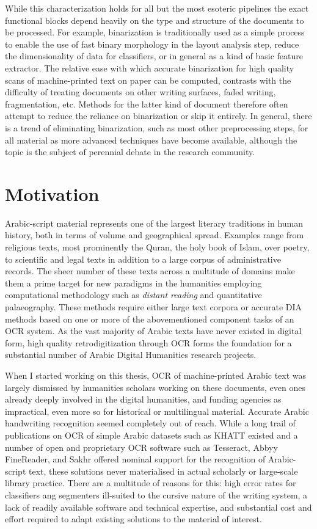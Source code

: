 While this characterization holds for all but the most esoteric pipelines the
exact functional blocks depend heavily on the type and structure of the
documents to be processed. For example, binarization is traditionally used as a
simple process to enable the use of fast binary morphology in the layout
analysis step, reduce the dimensionality of data for classifiers, or in general
as a kind of basic feature extractor. The relative ease with which accurate
binarization for high quality scans of machine-printed text on paper can be
computed, contrasts with the difficulty of treating documents on other writing
surfaces, faded writing, fragmentation, etc. Methods for the latter kind of
document therefore often attempt to reduce the reliance on binarization or skip
it entirely. In general, there is a trend of eliminating binarization, such as
most other preprocessing steps, for all material as more advanced techniques
have become available, although the topic is the subject of perennial debate in
the research community.

\section{Motivation}

Arabic-script material represents one of the largest literary traditions in
human history, both in terms of volume and geographical spread. Examples range
from religious texts, most prominently the Quran, the holy book of Islam, over
poetry, to scientific and legal texts in addition to a large corpus of
administrative records. The sheer number of these texts across a multitude of
domains make them a prime target for new paradigms in the humanities employing
computational methodology such as \emph{distant reading} and quantitative
palaeography. These methods require either large text corpora or accurate DIA
methods based on one or more of the abovementioned component tasks of an OCR
system. As the vast majority of Arabic texts have never existed in digital
form, high quality retrodigitization through OCR forms the foundation for a
substantial number of Arabic Digital Humanities research projects.

When I started working on this thesis, OCR of machine-printed Arabic text was
largely dismissed by humanities scholars working on these documents, even ones
already deeply involved in the digital humanities, and funding agencies as
impractical, even more so for historical or multilingual material. Accurate
Arabic handwriting recognition seemed completely out of reach. While a long
trail of publications on OCR of simple Arabic datasets such as KHATT
\cite{mahmoud2014khatt} existed and a number of open and proprietary OCR
software such as Tesseract, Abbyy FineReader, and Sakhr offered nominal support
for the recognition of Arabic-script text, these solutions never materialised
in actual scholarly or large-scale library practice. There are a multitude of
reasons for this: high error rates for classifiers ang segmenters ill-suited to
the cursive nature of the writing system, a lack of readily available software
and technical expertise, and substantial cost and effort required to adapt
existing solutions to the material of interest.

